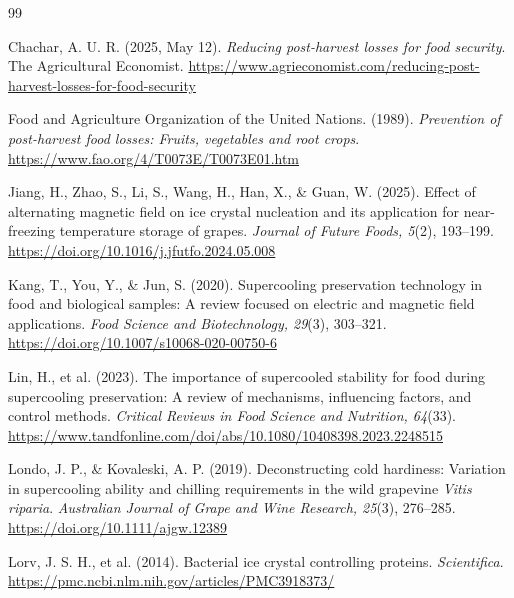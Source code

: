 
\newcommand{\contributor}[1]{\vspace{4pt}\noindent\textcolor{gray}{\small\textit{[Contributor: #1]}}\vspace{2pt}}



\begin{thebibliography}{99}

Chachar, A. U. R. (2025, May 12). \emph{Reducing post-harvest losses for food security}. The Agricultural Economist. \url{https://www.agrieconomist.com/reducing-post-harvest-losses-for-food-security}

Food and Agriculture Organization of the United Nations. (1989). \emph{Prevention of post-harvest food losses: Fruits, vegetables and root crops}. \url{https://www.fao.org/4/T0073E/T0073E01.htm}

Jiang, H., Zhao, S., Li, S., Wang, H., Han, X., \& Guan, W. (2025). Effect of alternating magnetic field on ice crystal nucleation and its application for near-freezing temperature storage of grapes. \emph{Journal of Future Foods, 5}(2), 193--199. \url{https://doi.org/10.1016/j.jfutfo.2024.05.008}

Kang, T., You, Y., \& Jun, S. (2020). Supercooling preservation technology in food and biological samples: A review focused on electric and magnetic field applications. \emph{Food Science and Biotechnology, 29}(3), 303--321. \url{https://doi.org/10.1007/s10068-020-00750-6}

Lin, H., et al. (2023). The importance of supercooled stability for food during supercooling preservation: A review of mechanisms, influencing factors, and control methods. \emph{Critical Reviews in Food Science and Nutrition, 64}(33). \url{https://www.tandfonline.com/doi/abs/10.1080/10408398.2023.2248515}

Londo, J. P., \& Kovaleski, A. P. (2019). Deconstructing cold hardiness: Variation in supercooling ability and chilling requirements in the wild grapevine \emph{Vitis riparia}. \emph{Australian Journal of Grape and Wine Research, 25}(3), 276--285. \url{https://doi.org/10.1111/ajgw.12389}

Lorv, J. S. H., et al. (2014). Bacterial ice crystal controlling proteins. \emph{Scientifica}. \url{https://pmc.ncbi.nlm.nih.gov/articles/PMC3918373/}


\end{thebibliography}
